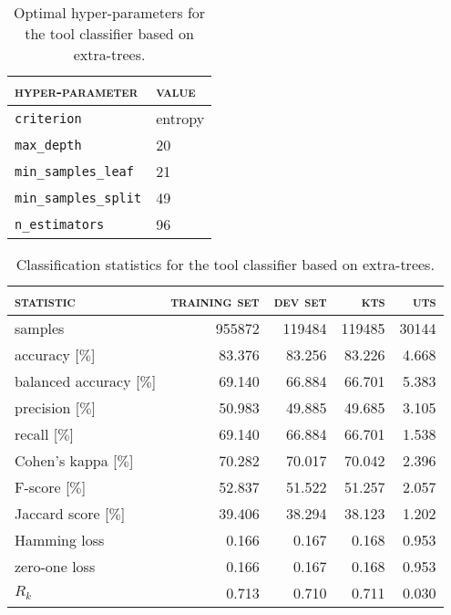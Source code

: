 \begin{table}[H]
	\centering
	\begin{tabular}{ll}
		\toprule
		\textsc{hyper-parameter} & \textsc{value}\\
		\midrule
		\verb|criterion| & entropy\\
		\verb|max_depth| & 20\\
		\verb|min_samples_leaf| & 21\\
		\verb|min_samples_split| & 49\\
		\verb|n_estimators| & 96\\
		\bottomrule
	\end{tabular}
	\caption{Optimal hyper-parameters for the tool classifier based on extra-trees.}
	\label{tab:hyperparameters_application_short_extra_trees}
\end{table}
\begin{table}[H]
	\centering
	\begin{tabular}{lrrrr}
		\toprule
		\textsc{statistic} & \textsc{training set} & \textsc{dev set} & \textsc{kts} & \textsc{uts}\\
		\midrule
		samples & 955872 & 119484 & 119485 & 30144\\
		accuracy [$\%$] & 83.376 & 83.256 & 83.226 & 4.668\\
		balanced accuracy [$\%$] & 69.140 & 66.884 & 66.701 & 5.383\\
		precision [$\%$] & 50.983 & 49.885 & 49.685 & 3.105\\
		recall [$\%$] & 69.140 & 66.884 & 66.701 & 1.538\\
		Cohen’s kappa [$\%$] & 70.282 & 70.017 & 70.042 & 2.396\\
		F-score [$\%$] & 52.837 & 51.522 & 51.257 & 2.057\\
		Jaccard score [$\%$] & 39.406 & 38.294 & 38.123 & 1.202\\
		Hamming loss & 0.166 & 0.167 & 0.168 & 0.953\\
		zero-one loss & 0.166 & 0.167 & 0.168 & 0.953\\
		$R_k$ & 0.713 & 0.710 & 0.711 & 0.030\\
		\bottomrule
	\end{tabular}
	\caption{Classification statistics for the tool classifier based on extra-trees.}
	\label{tab:classification_application_short_extra_trees}
\end{table}
